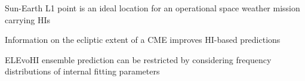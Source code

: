 \documentclass[draft]{agujournal}
\begin{document}







\begin{keypoints}
\item Sun-Earth L1 point is an ideal location for an operational space weather mission carrying HIs
\item Information on the ecliptic extent of a CME improves HI-based predictions
\item ELEvoHI ensemble prediction can be restricted by considering frequency distributions of internal fitting parameters
\end{keypoints}

%
%

\end{document}
